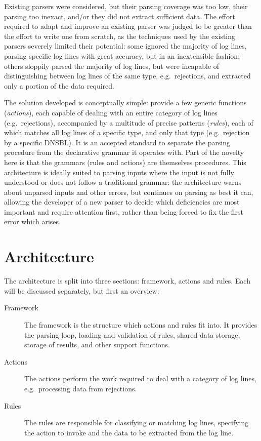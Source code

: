 \documentclass[draft]{svmult}
\begin{document}
Existing parsers were considered, but their parsing coverage was too low,
their parsing too inexact, and/or they did not extract sufficient data.
The effort required to adapt and improve an existing parser was judged to
be greater than the effort to write one from scratch, as the techniques
used by the existing parsers severely limited their potential: some ignored
the majority of log lines, parsing specific log lines with great accuracy,
but in an inextensible fashion; others sloppily parsed the majority of log
lines, but were incapable of distinguishing between log lines of the same
type, e.g.\ rejections, and extracted only a portion of the data required.

The solution developed is conceptually simple: provide a few generic
functions (\textit{actions\/}), each capable of dealing with an entire
category of log lines (e.g.\ rejections), accompanied by a multitude of
precise patterns (\textit{rules\/}), each of which matches all log lines of
a specific type, and only that type (e.g.\ rejection by a specific DNSBL).
It is an accepted standard to separate the parsing procedure from the
declarative grammar it operates with.  Part of the novelty here is that the
grammars (rules and actions) are themselves procedures.  This architecture
is ideally suited to parsing inputs where the input is not fully understood
or does not follow a traditional grammar: the architecture warns about
unparsed inputs and other errors, but continues on parsing as best it can,
allowing the developer of a new parser to decide which deficiencies are
most important and require attention first, rather than being forced to fix
the first error which arises.

\section{Architecture}

\label{Architecture}

The architecture is split into three sections: framework, actions and
rules.  Each will be discussed separately, but first an overview:

\begin{description}

    \item [Framework]  The framework is the structure which actions and
        rules fit into.  It provides the parsing loop, loading and
        validation of rules, shared data storage, storage of results, and
        other support functions.

    \item [Actions]  The actions perform the work required to deal with a
        category of log lines, e.g.\ processing data from rejections.

    \item [Rules]  The rules are responsible for classifying or matching
        log lines, specifying the action to invoke and the data to be
        extracted from the log line.

\end{description}
\end{document}
